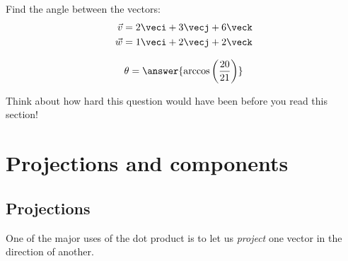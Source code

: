 \documentclass{ximera}
\begin{document}
\begin{question}
  Find the angle between the vectors:
  \begin{align*}
  \vec{v} &= 2\veci+3\vecj+6\veck\\
  \vec{w} &= 1\veci+2\vecj+2\veck
  \end{align*}
  \begin{prompt}
  \[
  \theta = \answer{ \arccos\left(\frac{20}{21}\right)}
  \]
  \end{prompt}
  \begin{feedback}
    Think about how hard this question would have been before you read this section!
  \end{feedback}
\end{question}



\section{Projections and components}

\subsection{Projections}
One of the major uses of the dot product is to let us \textit{project}
one vector in the direction of another.
\end{document}
